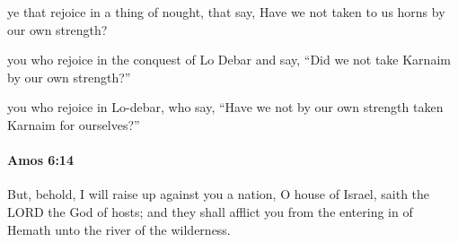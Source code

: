 			\begin{versebox}
					\item[BHS] 
					\item[LXX] 
					\item[ASV] ye that rejoice in a thing of nought, that say, Have we not taken to us horns by our own strength?
					\item[NIV] you who rejoice in the conquest of Lo Debar and say, “Did we not take Karnaim by our own strength?”
					\item[NRSV] you who rejoice in Lo-debar, who say, “Have we not by our own strength taken Karnaim for ourselves?”
			\end{versebox}

		\paragraph{Amos 6:14} %
			\label{AMOS-6-14}

			But, behold, I will raise up against you a nation, O house of Israel, saith the LORD the God of hosts; and they shall afflict you from the entering in of Hemath unto the river of the wilderness.


